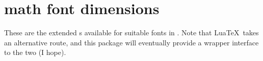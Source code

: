 
%
%
%
%

\section{ math font dimensions}

These are the extended \cmd\fontdimen s available for suitable fonts
in \XeTeX. Note that Lua\TeX\ takes an alternative route, and this package
will eventually provide a wrapper interface to the two (I hope).

\setcounter{mfdimen}{9}
\newcommand\mathfontdimen[2]{^^A
  \stepcounter{mfdimen}^^A
  \themfdimen & {\scshape\small #1} & #2\vspace{0.5ex} \tabularnewline}

